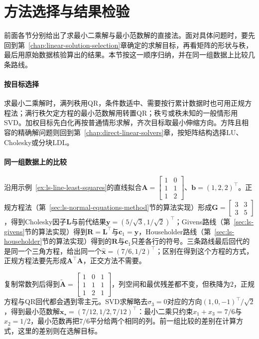 \section{方法选择与结果检验}
\label{sec:ls-direct-method-comparison}

前面各节分别给出了求最小二乘解与最小范数解的直接法。面对具体问题时，要先回到第~\ref{chap:linear-solution-selection}章确定的求解目标，再看矩阵的形状与秩，最后用原始数据核验算出的结果。本节按这一顺序归纳，并在同一组数据上比较几条路线。

\paragraph{按目标选择}
求最小二乘解时，满列秩用QR，条件数适中、需要按行累计数据时也可用正规方程法；满行秩欠定方程的最小范数解用转置QR；秩亏或秩未知的一般情形用SVD。加权目标先白化再按普通情形求解，齐次目标取最小伸缩方向。方阵且相容的精确解问题则回到第~\ref{chap:direct-linear-solvers}章，按矩阵结构选择LU、Cholesky或分块LDL。

\paragraph{同一组数据上的比较}
沿用示例~\ref{ex:ls-line-least-squares}的直线拟合$\bm A=\left[\begin{smallmatrix}1&0\\1&1\\1&2\end{smallmatrix}\right]$、$\bm b=(1,2,2)^\top$。正规方程法（第~\ref{sec:ls-normal-equations-method}节的算法实现）形成$\bm G=\left[\begin{smallmatrix}3&3\\3&5\end{smallmatrix}\right]$，得到Cholesky因子$\bm L$与前代结果$\bm y=(5/\sqrt3,1/\sqrt2)^\top$；Givens路线（第~\ref{sec:ls-givens}节的算法实现）得到$\bm R=\bm L^\top$与$\bm c_1=\bm y$，Householder路线（第~\ref{sec:ls-householder}节的算法实现）得到的$\bm R$与$\bm c_1$只差各行的符号。三条路线最后回代的是同一个三角方程，给出同一个$\hat{\bm x}=(7/6,1/2)^\top$；区别在得到这个方程的方式，正规方程法要先形成$\bm A^\top\bm A$，正交方法不需要。

复制常数列后得到$\widetilde{\bm A}=\left[\begin{smallmatrix}1&0&1\\1&1&1\\1&2&1\end{smallmatrix}\right]$，列空间和最优残差都不变，但秩降为$2$，正规方程与QR回代都会遇到零主元。SVD求解略去$\sigma_3=0$对应的方向$(1,0,-1)^\top/\sqrt2$，得到最小范数解$\bm x_\star=(7/12,1/2,7/12)^\top$：最小二乘只约束$x_1+x_3=7/6$与$x_2=1/2$，最小范数再把$7/6$平分给两个相同的列。前一组比较的差别在计算方式，这里的差别则在选解目标。

